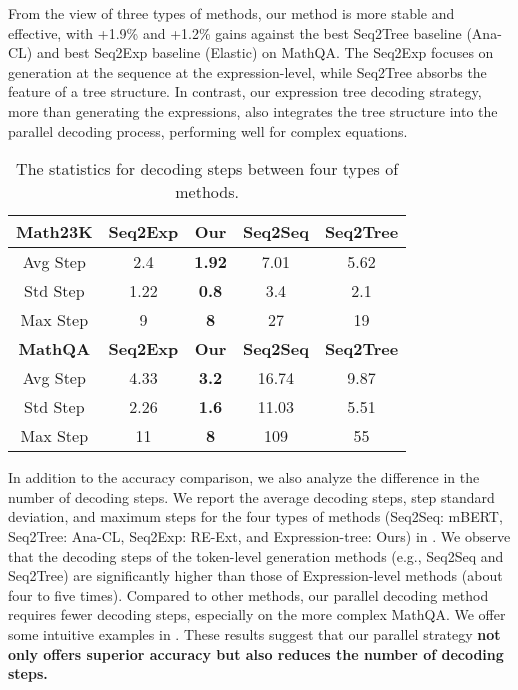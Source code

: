 \documentclass[11pt]{article}
\begin{document}
From the view of three types of methods, our method is more stable and effective, with +1.9\% and +1.2\% gains against the best Seq2Tree baseline (Ana-CL) and best Seq2Exp baseline (Elastic) on MathQA. The Seq2Exp focuses on generation at the sequence at the expression-level, while Seq2Tree absorbs the feature of a tree structure. In contrast, our expression tree decoding strategy, more than generating the expressions, also integrates the tree structure into the parallel decoding process, performing well for complex equations.

\begin{table}[t]\small
\centering
\begin{tabular}{c|c|c|c|c}
\toprule
\textbf{Math23K} & \textbf{Seq2Exp} & \textbf{Our} & \textbf{Seq2Seq} & \textbf{Seq2Tree} \\
\midrule
Avg Step & 2.4 & \textbf{1.92} & 7.01 & 5.62 \\
Std Step & 1.22 & \textbf{0.8} & 3.4 & 2.1 \\
Max Step & 9 & \textbf{8} & 27 & 19 \\
\toprule[1pt]
\textbf{MathQA} & \textbf{Seq2Exp} & \textbf{Our} & \textbf{Seq2Seq} & \textbf{Seq2Tree} \\
\toprule[1pt]
Avg Step & 4.33 & \textbf{3.2} & 16.74 & 9.87 \\
Std Step & 2.26 & \textbf{1.6} & 11.03 & 5.51 \\
Max Step & 11 & \textbf{8} & 109 & 55 \\
\bottomrule
\end{tabular}
\caption{The statistics for decoding steps between four types of methods.}
\label{table:decoding step}
\end{table}
 In addition to the accuracy comparison, we also analyze the difference in the number of decoding steps. We report the average decoding steps, step standard deviation, and maximum steps for the four types of methods (Seq2Seq: mBERT, Seq2Tree: Ana-CL, Seq2Exp: RE-Ext, and Expression-tree: Ours) in . We observe that the decoding steps of the token-level generation methods (e.g., Seq2Seq and Seq2Tree) are significantly higher than those of Expression-level methods (about four to five times). Compared to other methods, our parallel decoding method requires fewer decoding steps, especially on the more complex MathQA. We offer some intuitive examples in . These results suggest that our parallel strategy \textbf{not only offers superior accuracy but also reduces the number of decoding steps.}
\end{document}

